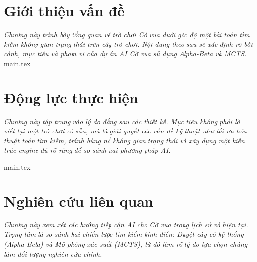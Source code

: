 \documentclass[12pt, a4paper]{report}
\theoremstyle{definition}
\begin{document}
\newpage

\tableofcontents
\thispagestyle{empty}






\listoftables
\thispagestyle{empty}

\listoffigures
\thispagestyle{empty}


\clearpage

\thispagestyle{empty}


\setcounter{page}{1}

\chapter{Giới thiệu vấn đề}
\label{chap:overall}
\thispagestyle{fancy}
\textit{Chương này trình bày tổng quan về trò chơi Cờ vua dưới góc độ một bài toán tìm kiếm không gian trạng thái trên cây trò chơi. Nội dung theo sau sẽ xác định rõ bối cảnh, mục tiêu và phạm vi của dự án AI Cờ vua sử dụng Alpha-Beta và MCTS.}
{main.tex}

\chapter{Động lực thực hiện}\label{chap:base-knowledge}
\thispagestyle{fancy}
\textit{Chương này tập trung vào lý do đằng sau các thiết kế. Mục tiêu không phải là viết lại một trò chơi có sẵn, mà là giải quyết các vấn đề kỹ thuật như tối ưu hóa thuật toán tìm kiếm, tránh bùng nổ không gian trạng thái và xây dựng một kiến trúc engine đủ rõ ràng để so sánh hai phương pháp AI.}


{main.tex}



\chapter{Nghiên cứu liên quan}
\label{chap:eval}
\thispagestyle{fancy}

\textit{Chương này xem xét các hướng tiếp cận AI cho Cờ vua trong lịch sử và hiện tại. Trọng tâm là so sánh hai chiến lược tìm kiếm kinh điển: Duyệt cây có hệ thống (Alpha-Beta) và Mô phỏng xác suất (MCTS), từ đó làm rõ lý do lựa chọn chúng làm đối tượng nghiên cứu chính.}
\end{document}
